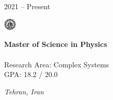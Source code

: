 \documentclass[9pt, purple]{./template/cv} %
\begin{document}
\begin{minipage}{\linewidth}
    \vspace{6mm}
    \begin{minipage}[t]{0.15\linewidth}
        \vspace{-\baselineskip}
        \textcolor{soft}{2021 -- Present} 
    \end{minipage}
    \begin{minipage}[t]{8mm}
        \vspace{-\baselineskip}
        \includegraphics[width=6mm]{img/sharif}\centering
    \end{minipage}
    \begin{minipage}[t]{0.5\linewidth}
        \vspace{-\baselineskip}
        {\textcolor{accentbackground}{\textbf{Master of Science in Physics}}} \\
         \\
        Research Area: Complex Systems\\
        GPA: 18.2 / 20.0
    \end{minipage}
    \hfill
    \begin{minipage}[t]{0.1\linewidth}
        \vspace{-\baselineskip}
        \textcolor{accentbackground}{\textit{Tehran, Iran}} 
    \end{minipage}
    

\end{minipage}
\end{document}
